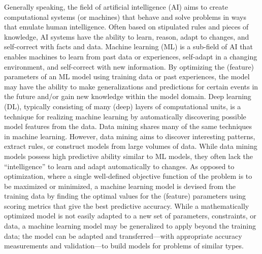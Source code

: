 Generally speaking, the field of artificial intelligence (AI) aims to create computational systems (or machines) that behave and solve problems in ways that emulate human intelligence. Often based on stipulated rules and pieces of knowledge, AI systems have the ability to learn, reason, adapt to changes, and self-correct with facts and data. Machine learning (ML) is a sub-field of AI that enables machines to learn from past data or experiences, self-adapt in a changing environment, and self-correct with new information. By optimizing the (feature) parameters of an ML model using training data or past experiences, the model may have the ability to make generalizations and predictions for certain events in the future and/or gain new knowledge within the model domain. Deep learning (DL), typically consisting of many (deep) layers of computational units, is a technique for realizing machine learning by automatically discovering possible model features from the data. Data mining shares many of the same techniques in machine learning. However, data mining aims to discover interesting patterns, extract rules, or construct models from large volumes of data. While data mining models possess high predictive ability similar to ML models, they often lack the ``intelligence'' to learn and adapt automatically to changes. As opposed to optimization, where a single well-defined objective function of the problem is to be maximized or minimized, a machine learning model is devised from the training data by finding the optimal values for the (feature) parameters using scoring metrics that give the best predictive accuracy. While a mathematically optimized model is not easily adapted to a new set of parameters, constraints, or data, a machine learning model may be generalized to apply beyond the training data; the model can be adapted and transferred—with appropriate accuracy measurements and validation—to build models for problems of similar types. 

